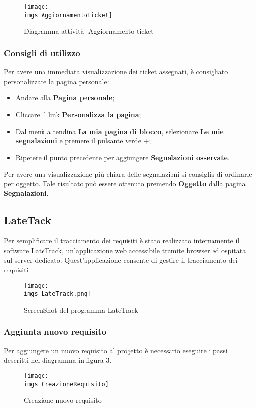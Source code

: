 \begin{figure}[H]
  \centering
    \texttt{[image: \\imgs AggiornamentoTicket]}
  \caption{Diagramma attività -Aggiornamento ticket}
  \label{fig:gull}
\end{figure}




\subsubsection{Consigli di utilizzo}
 
	Per avere una immediata visualizzazione dei ticket assegnati, è consigliato personalizzare 
	la pagina personale: 
	\begin{itemize}
		\item Andare alla \textbf{Pagina personale}; 
		\item Cliccare il link \textbf{Personalizza la pagina}; 
		\item Dal menù a tendina \textbf{La mia pagina di blocco}, selezionare \textbf{Le mie segnalazioni} 
		e premere il pulsante verde +; 
		\item Ripetere il punto precedente per aggiungere \textbf{Segnalazioni osservate}. 
	
	\end{itemize}

	Per avere una visualizzazione più chiara delle segnalazioni si consiglia di ordinarle per 
	oggetto. Tale risultato può essere ottenuto premendo \textbf{Oggetto} dalla pagina \textbf{Segnalazioni}.

\subsection{LateTack}
\label{sec:lateTrack}
Per semplificare il tracciamento dei requisiti è stato realizzato internamente il software
LateTrack, un’applicazione web accessibile tramite browser ed ospitata sul server dedicato.
Quest’applicazione consente di gestire il tracciamento dei requisiti

\begin{figure}[H]
\texttt{[image: \\imgs LateTrack.png]}
  \caption{ScreenShot del programma LateTrack}
  \label{fig:lateTrack}
\end{figure}
\subsubsection{Aggiunta nuovo requisito}
Per aggiungere un nuovo requisito al progetto è necessario eseguire i passi descritti nel
diagramma in figura \ref{fig:CreazioneRequisito}.
\begin{figure}
\texttt{[image: \\imgs CreazioneRequisito]}
  \caption{Creazione nuovo requisito}
  \label{fig:CreazioneRequisito}
\end{figure}